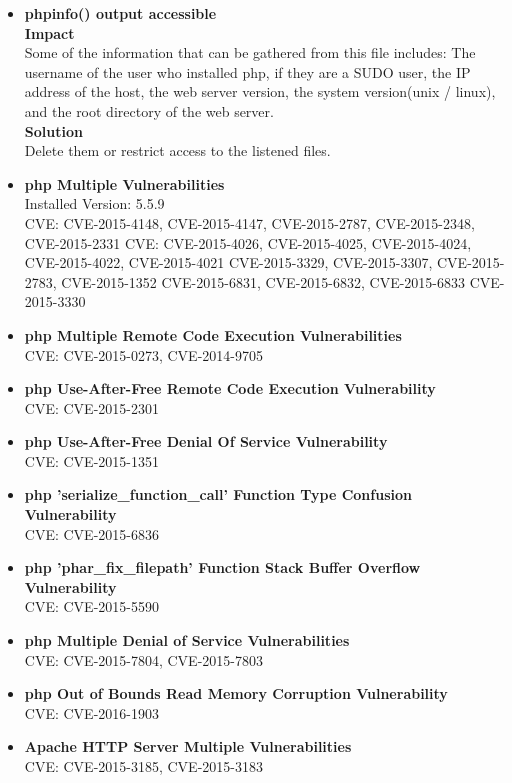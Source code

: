 \begin{itemize}
\item \textbf{phpinfo() output accessible}\\

\textbf{Impact}\\
Some of the information that can be gathered from this file includes: The username of the user who installed php, if they are a SUDO user, the IP address of the host, the web server version, the system version(unix / linux), and the root directory of the web server.\\

\textbf{Solution}\\
Delete them or restrict access to the listened files.\\

\item \textbf{php Multiple Vulnerabilities} \\
Installed Version: 5.5.9\\

CVE: CVE-2015-4148, CVE-2015-4147, CVE-2015-2787, CVE-2015-2348, CVE-2015-2331 CVE: CVE-2015-4026, CVE-2015-4025, CVE-2015-4024, CVE-2015-4022, CVE-2015-4021 CVE-2015-3329, CVE-2015-3307, CVE-2015-2783, CVE-2015-1352 CVE-2015-6831, CVE-2015-6832, CVE-2015-6833 CVE-2015-3330
\item \textbf{php Multiple Remote Code Execution Vulnerabilities} \\
CVE: CVE-2015-0273, CVE-2014-9705 
\item \textbf{php Use-After-Free Remote Code Execution Vulnerability } \\
CVE: CVE-2015-2301
\item \textbf{php Use-After-Free Denial Of Service Vulnerability} \\
CVE: CVE-2015-1351
\item \textbf{php 'serialize\_function\_call' Function Type Confusion Vulnerability} \\
CVE: CVE-2015-6836
\item \textbf{php 'phar\_fix\_filepath' Function Stack Buffer Overflow Vulnerability} \\
CVE: CVE-2015-5590
\item \textbf{php Multiple Denial of Service Vulnerabilities} \\
CVE: CVE-2015-7804, CVE-2015-7803
\item \textbf{php Out of Bounds Read Memory Corruption Vulnerability} \\
CVE: CVE-2016-1903
\item \textbf{Apache HTTP Server Multiple Vulnerabilities} \\
CVE: CVE-2015-3185, CVE-2015-3183


\end{itemize}
